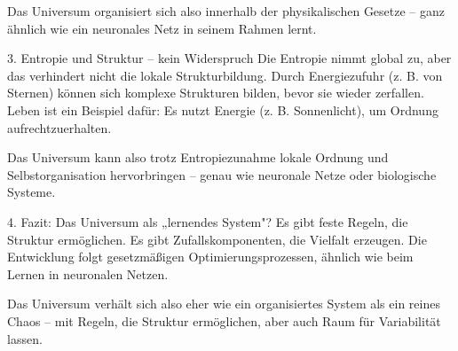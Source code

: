 \documentclass{article}
\begin{document}
	Das Universum organisiert sich also innerhalb der physikalischen Gesetze – ganz ähnlich wie ein neuronales Netz in seinem Rahmen lernt.
	
	3. Entropie und Struktur – kein Widerspruch
	Die Entropie nimmt global zu, aber das verhindert nicht die lokale Strukturbildung.
	Durch Energiezufuhr (z. B. von Sternen) können sich komplexe Strukturen bilden, bevor sie wieder zerfallen.
	Leben ist ein Beispiel dafür: Es nutzt Energie (z. B. Sonnenlicht), um Ordnung aufrechtzuerhalten.
	
	Das Universum kann also trotz Entropiezunahme lokale Ordnung und Selbstorganisation hervorbringen – genau wie neuronale Netze oder biologische Systeme.
	
	4. Fazit: Das Universum als „lernendes System"?
	Es gibt feste Regeln, die Struktur ermöglichen.
	Es gibt Zufallskomponenten, die Vielfalt erzeugen.
	Die Entwicklung folgt gesetzmäßigen Optimierungsprozessen, ähnlich wie beim Lernen in neuronalen Netzen.
	
	Das Universum verhält sich also eher wie ein organisiertes System als ein reines Chaos – mit Regeln, die Struktur ermöglichen, aber auch Raum für Variabilität lassen.
	
\end{document}
